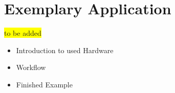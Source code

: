 \section{Exemplary Application}
\colorbox{yellow}{to be added}
\begin{itemize}
	\item Introduction to used Hardware
	\item Workflow
	\item Finished Example
\end{itemize}